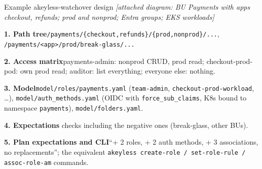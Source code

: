 \begin{session}{Example}
\you akeyless-watchover design \emph{[attached diagram: BU Payments with apps checkout, refunds; prod and nonprod; Entra groups; EKS workloads]}

\agent \textbf{1. Path tree}\quad \texttt{/payments/\{checkout,refunds\}/\{prod,nonprod\}/...},
\texttt{/payments/<app>/prod/break-glass/...}

\textbf{2. Access matrix}\quad payments-admin: nonprod CRUD, prod read; checkout-prod-pod: own prod
read; auditor: list everything; everyone else: nothing.

\textbf{3. Model}\quad \texttt{model/roles/payments.yaml} (\texttt{team-admin}, \texttt{checkout-prod-workload}, \ldots),
\texttt{model/auth\_methods.yaml} (OIDC with \texttt{force\_sub\_claims}, K8s bound to namespace
\texttt{payments}), \texttt{model/folders.yaml}.

\textbf{4. Expectations} checks including the negative ones (break-glass, other BUs).

\textbf{5. Plan expectations and CLI}\quad ``+ 2 roles, + 2 auth methods, + 3 associations, no
replacements''; the equivalent \texttt{akeyless create-role / set-role-rule / assoc-role-am} commands.
\end{session}
